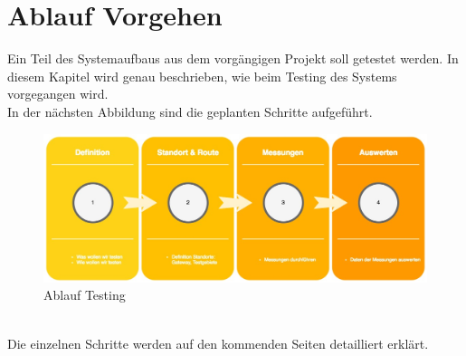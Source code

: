\documentclass[11pt,english,german]{report}
\theoremstyle{definition}
\begin{document}
\section{Ablauf Vorgehen}
Ein Teil des Systemaufbaus aus dem vorgängigen Projekt soll getestet werden. In diesem Kapitel wird genau beschrieben, wie beim Testing des Systems vorgegangen wird.\\[0.3cm]
In der nächsten Abbildung sind die geplanten Schritte aufgeführt.
\begin{figure}[h]
	\centering
	\includegraphics[width=\textwidth]{img/projectFlow_testing.jpg}
	\caption[Flowchart Testing]
	{Ablauf Testing}
\end{figure}
\\ 
Die einzelnen Schritte werden auf den kommenden Seiten detailliert erklärt.
\newpage
\end{document}
